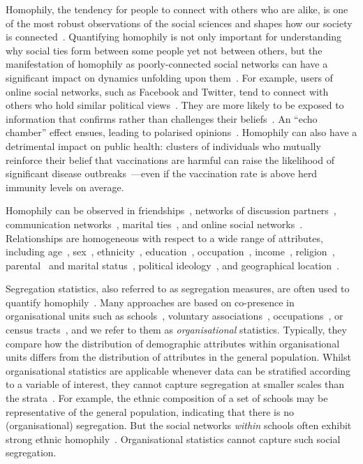 \documentclass{scrartcl}
\begin{document}
Homophily, the tendency for people to connect with others who are alike, is one of the most robust observations of the social sciences and shapes how our society is connected~\cite{McPherson2001}. Quantifying homophily is not only important for understanding why social ties form between some people yet not between others, but the manifestation of homophily as poorly-connected social networks can have a significant impact on dynamics unfolding upon them~\cite{Golub2012}. For example, users of online social networks, such as Facebook and Twitter, tend to connect with others who hold similar political views~\cite{Boutyline2017}. They are more likely to be exposed to information that confirms rather than challenges their beliefs~\cite{Bakshy2015}. An ``echo chamber'' effect ensues, leading to polarised opinions~\cite{DeMarzo2003}. Homophily can also have a detrimental impact on public health: clusters of individuals who mutually reinforce their belief that vaccinations are harmful can raise the likelihood of significant disease outbreaks~\cite{Salathe2008}---even if the vaccination rate is above herd immunity levels on average.

Homophily can be observed in friendships~\cite{Currarini2009, Hipp2009}, networks of discussion partners~\cite{McPherson2006}, communication networks~\cite{Wang2013, Leo2016}, marital ties~\cite{Blau1984}, and online social networks~\cite{Chang2010}. Relationships are homogeneous with respect to a wide range of attributes, including age~\cite{Marsden1988,Smith2014}, sex~\cite{Smith2014}, ethnicity~\cite{Chang2010, Blumenstock2013, Currarini2009}, education~\cite{McPherson2006, Smith2014,Johnson1989}, occupation~\cite{Chan2004}, income~\cite{Leo2016, Wang2013, Johnson1989}, religion~\cite{Platt2012}, parental~\cite{Johnson1989} and marital status~\cite{Kalmijn2007}, political ideology~\cite{Bakshy2015, Boutyline2017}, and geographical location~\cite{Lambiotte2008, Expert2011, Backstrom2010, Scellato2011, Illenberger2013}.

Segregation statistics, also referred to as segregation measures, are often used to quantify homophily~\cite{Rodriguez-Moral2016, Bojanowski2014}. Many approaches are based on co-presence in organisational units such as schools~\cite{Orfield2014}, voluntary associations~\cite{Popielarz1999}, occupations~\cite{Charles1995}, or census tracts~\cite{Reardon2004}, and we refer to them as \emph{organisational} statistics. Typically, they compare how the distribution of demographic attributes within organisational units differs from the distribution of attributes in the general population. Whilst organisational statistics are applicable whenever data can be stratified according to a variable of interest, they cannot capture segregation at smaller scales than the strata~\cite{Blumenstock2013}. For example, the ethnic composition of a set of schools may be representative of the general population, indicating that there is no (organisational) segregation. But the social networks \emph{within} schools often exhibit strong ethnic homophily~\cite{Currarini2009,Moody2001}. Organisational statistics cannot capture such social segregation.
\end{document}
